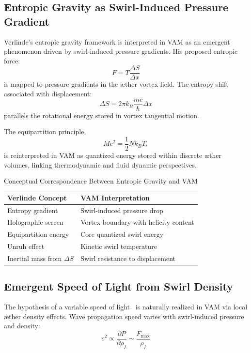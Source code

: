 \documentclass[preprint]{revtex4-2}
\begin{document}
            \subsection{Entropic Gravity as Swirl-Induced Pressure Gradient}
            Verlinde's entropic gravity framework \cite{verlinde2010emergent} is interpreted in VAM as an emergent phenomenon driven by swirl-induced pressure gradients. His proposed entropic force:
            \[
                F = T \frac{\Delta S}{\Delta x}
            \]
            is mapped to pressure gradients in the æther vortex field. The entropy shift associated with displacement:
            \[
                \Delta S = 2\pi k_B \frac{mc}{\hbar} \Delta x
            \]
            parallels the rotational energy stored in vortex tangential motion.

            The equipartition principle,
            \[
                Mc^2 = \frac{1}{2} N k_B T,
            \]
            is reinterpreted in VAM as quantized energy stored within discrete æther volumes, linking thermodynamic and fluid dynamic perspectives.

            \begin{table}[H]
                \centering
                \footnotesize
                \caption{Conceptual Correspondence Between Entropic Gravity and VAM}
                \begin{tabular}{|l|l|}
                    \hline
                    \textbf{Verlinde Concept} & \textbf{VAM Interpretation} \\
                    \hline
                    Entropy gradient & Swirl-induced pressure drop \\
                    Holographic screen & Vortex boundary with helicity content \\
                    Equipartition energy & Core quantized swirl energy \\
                    Unruh effect & Kinetic swirl temperature \\
                    Inertial mass from $\Delta S$ & Swirl resistance to displacement \\
                    \hline
                \end{tabular}
            \end{table}

            \subsection*{Emergent Speed of Light from Swirl Density}
            The hypothesis of a variable speed of light~\cite{popescu2008cvar} is naturally realized in VAM via local æther density effects. Wave propagation speed varies with swirl-induced pressure and density:
            \[
                c^2 \propto \frac{\partial P}{\partial \rho_{\scriptscriptstyle\boldsymbol\!f}} \sim \frac{F_\text{max}}{\rho_{\scriptscriptstyle\boldsymbol\!f}}
            \]
\end{document}
